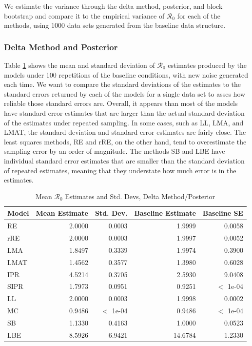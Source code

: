 \documentclass[12pt]{article}
\newcommand{\rr}{\ensuremath{\mathcal{R}_0}}
\begin{document}
We estimate the variance through the delta method, posterior, and  block bootstrap and compare it to the empirical variance of $\rr$ for each of the methods, using 1000 data sets generated from the baseline data structure.

\subsubsection{Delta Method and Posterior}

Table \ref{tab:rep-samp} shows the mean and standard deviation of $\rr$ estimates produced by the models under 100 repetitions of the baseline conditions, with new noise generated each time. We want to compare the standard deviations of the estimates to the standard errors returned by each of the models for a single data set to asses how reliable those standard errors are. Overall, it appears than most of the models have standard error estimates that are larger than the actual standard deviation of the estimates under repeated sampling. In some cases, such as LL, LMA, and LMAT, the standard deviation and standard error estimates are fairly close. The least squares methods, RE and rRE, on the other hand, tend to overestimate the sampling error by an order of magnitude. The methods SB and LBE have individual standard error estimates that are smaller than the standard deviation of repeated estimates, meaning that they understate how much error is in the estimates.


\begin{table}[H]
	
	\centering
	\begin{tabular}[t]{l|r|r|r|r}
		\hline
		Model & Mean Estimate & Std. Dev. & Baseline Estimate & Baseline SE\\
		\hline
		RE & 2.0000 & 0.0003 & 1.9999 & 0.0058\\
		\hline
		rRE & 2.0000 & 0.0003 & 1.9997 & 0.0052\\
		\hline
		LMA & 1.8497 & 0.3339 & 1.9974 & 0.3900\\
		\hline
		LMAT & 1.4562 & 0.3577 & 1.3980 & 0.6028 \\
		\hline
		IPR & 4.5214 & 0.3705 & 2.5930 & 9.0408\\
		\hline
		SIPR & 1.7973 & 0.0951 & 0.9251 & $<$ 1e-04 \\
		\hline
		LL & 2.0000 & 0.0003 & 1.9998 & 0.0002\\
		\hline
		MC & 0.9486 & $<$ 1e-04 & 0.9486 & $<$ 1e-04\\
		\hline
		SB & 1.1330 & 0.4163 & 1.0000 & 0.0523\\
		\hline
		LBE & 8.5926 & 6.9421 & 14.6784 & 1.2330\\
		\hline
	\end{tabular}
        \caption{Mean $\rr$ Estimates and Std. Devs, Delta Method/Posterior}
        \label{tab:rep-samp}
\end{table}
\end{document}

